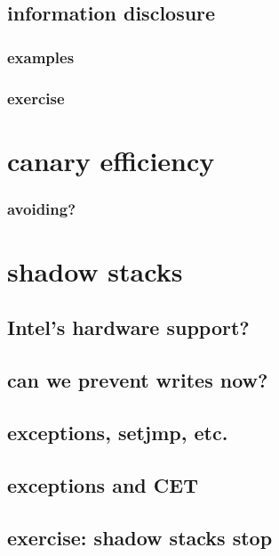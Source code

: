 

\subsection{information disclosure}
\subsubsection{examples}




\subsubsection{exercise}


\section{canary efficiency}


\subsubsection{avoiding?}


\section{shadow stacks}


\subsection{Intel's hardware support?}


\subsection{can we prevent writes now?}


\subsection{exceptions, setjmp, etc.}


\subsection{exceptions and CET}


\subsection{exercise: shadow stacks stop}



